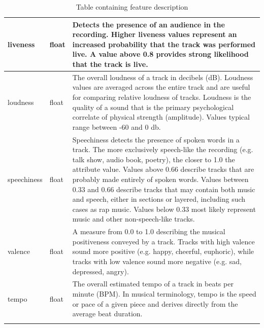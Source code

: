 \begin{longtable}{|p{3cm}|p{1.6cm}|p{7cm}|}
liveness         & float        & Detects the presence of an audience in the recording. Higher liveness values represent an increased probability that the track was performed live. A value above 0.8 provides strong likelihood that the track is live.                                                                                                                                                                                                                                                                                            \\ \hline
loudness         & float        & The overall loudness of a track in decibels (dB). Loudness values are averaged across the entire track and are useful for comparing relative loudness of tracks. Loudness is the quality of a sound that is the primary psychological correlate of physical strength (amplitude). Values typical range between -60 and 0 db.                                                                                                                                                                                       \\ \hline
speechiness      & float        & Speechiness detects the presence of spoken words in a track. The more exclusively speech-like the recording (e.g. talk show, audio book, poetry), the closer to 1.0 the attribute value. Values above 0.66 describe tracks that are probably made entirely of spoken words. Values between 0.33 and 0.66 describe tracks that may contain both music and speech, either in sections or layered, including such cases as rap music. Values below 0.33 most likely represent music and other non-speech-like tracks. \\ \hline
valence          & float        & A measure from 0.0 to 1.0 describing the musical positiveness conveyed by a track. Tracks with high valence sound more positive (e.g. happy, cheerful, euphoric), while tracks with low valence sound more negative (e.g. sad, depressed, angry).                                                                                                                                                                                                                                                                  \\ \hline
tempo            & float        & The overall estimated tempo of a track in beats per minute (BPM). In musical terminology, tempo is the speed or pace of a given piece and derives directly from the average beat duration. \\ \hline
\caption{Table containing feature description}
\label{tab:feature}
\end{longtable}

